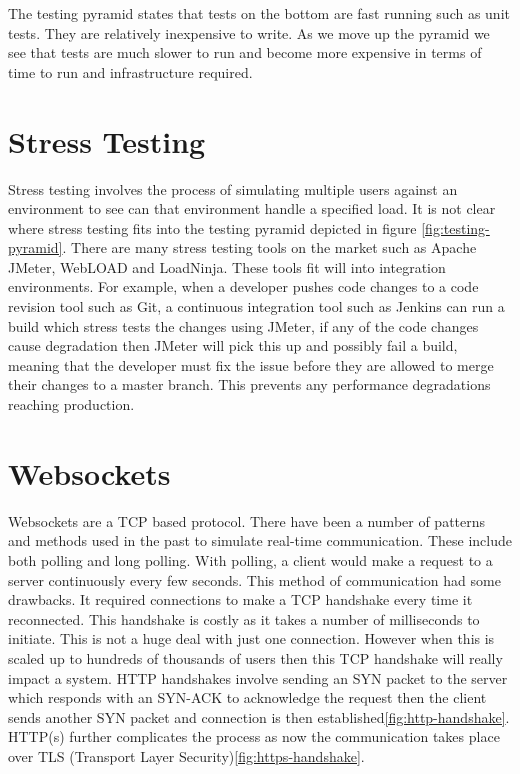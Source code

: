 The testing pyramid states that tests on the bottom are fast running such as unit tests. They are relatively inexpensive to write. As we move up the pyramid we see that tests are much slower to run and become more expensive in terms of time to run and infrastructure required.

\section{Stress Testing}

Stress testing involves the process of simulating multiple users against an environment to see can that environment handle a specified load. It is not clear where stress testing fits into the testing pyramid depicted in figure \ref{fig:testing-pyramid}. There are many stress testing tools on the market such as Apache JMeter, WebLOAD and LoadNinja. These tools fit will into integration environments. For example, when a developer pushes code changes to a code revision tool such as Git, a continuous integration tool such as Jenkins can run a build which stress tests the changes using JMeter, if any of the code changes cause degradation then JMeter will pick this up and possibly fail a build, meaning that the developer must fix the issue before they are allowed to merge their changes to a master branch. This prevents any performance degradations reaching production.

\section{Websockets}

Websockets are a TCP based protocol\cite{8089962}. There have been a number of patterns and methods used in the past to simulate real-time communication. These include both polling and long polling. With polling, a client would make a request to a server continuously every few seconds. This method of communication had some drawbacks. It required connections to make a TCP handshake every time it reconnected. This handshake is costly as it takes a number of milliseconds to initiate. This is not a huge deal with just one connection. However when this is scaled up to hundreds of thousands of users then this TCP handshake will really impact a system\cite{5735801}. HTTP handshakes involve sending an SYN packet to the server which responds with an SYN-ACK to acknowledge the request then the client sends another SYN packet and connection is then established\ref{fig:http-handshake}\cite{5735801}. HTTP(s) further complicates the process as now the communication takes place over TLS (Transport Layer Security)\ref{fig:https-handshake}. 

